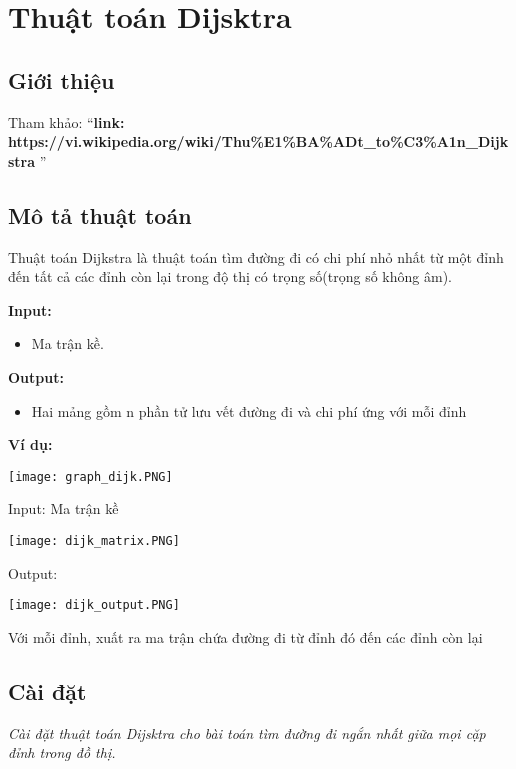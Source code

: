 \documentclass[a4paper]{article}
\begin{document}
\thispagestyle{empty}

\newpage
\tableofcontents

\newpage

\newpage
\section{Thuật toán Dijsktra}
\subsection{Giới thiệu}
Tham khảo: ``\textbf{link: https://vi.wikipedia.org/wiki/Thu\%E1\%BA\%ADt\_to\%C3\%A1n\_Dijkstra
}''
\subsection{Mô tả thuật toán}
Thuật toán Dijkstra là thuật toán tìm đường đi có chi phí nhỏ nhất từ một đỉnh đến tất cả các đỉnh còn lại trong độ thị có trọng số(trọng số không âm).

\textbf{Input:}
\begin{itemize}
    \item Ma trận kề.
\end{itemize}

\textbf{Output:}
\begin{itemize}
    \item Hai mảng gồm n phần tử lưu vết đường đi và chi phí ứng với mỗi đỉnh 
\end{itemize}
\textbf{Ví dụ:}
\begin{center}
    \texttt{[image: graph\_dijk.PNG]}
\end{center}
Input: Ma trận kề
\begin{center}
    \texttt{[image: dijk\_matrix.PNG]}
\end{center}
Output:
\begin{center}
    \texttt{[image: dijk\_output.PNG]}
\end{center}
Với mỗi đỉnh, xuất ra ma trận chứa đường đi từ đỉnh đó đến các đỉnh còn lại
\subsection{Cài đặt}

\itshape{Cài đặt thuật toán Dijsktra cho bài toán tìm đường đi ngắn nhất giữa mọi cặp đỉnh trong đồ thị.}
\end{document}
